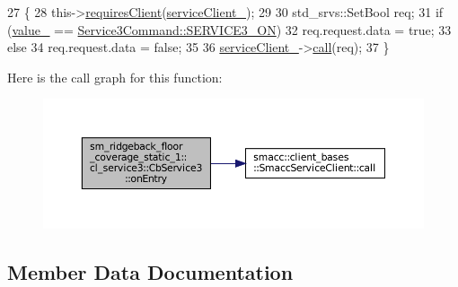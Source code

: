 \begin{DoxyCode}
27   \{
28     this->\hyperlink{classsmacc_1_1ISmaccClientBehavior_a32b16e99e3b4cb289414203dc861a440}{requiresClient}(\hyperlink{classsm__ridgeback__floor__coverage__static__1_1_1cl__service3_1_1CbService3_aabf21a061de68683b96bb96e6d5d88ad}{serviceClient\_});
29 
30     std\_srvs::SetBool req;
31     \textcolor{keywordflow}{if} (\hyperlink{classsm__ridgeback__floor__coverage__static__1_1_1cl__service3_1_1CbService3_a845615b00a06fa3d08fff04282572348}{value\_} == \hyperlink{namespacesm__ridgeback__floor__coverage__static__1_1_1cl__service3_aaba74bbc34b595ed42909975cedd5961a13cdca48a01bbb44fa8fb35567fbc58e}{Service3Command::SERVICE3\_ON})
32       req.request.data = \textcolor{keyword}{true};
33     \textcolor{keywordflow}{else}
34       req.request.data = \textcolor{keyword}{false};
35 
36     \hyperlink{classsm__ridgeback__floor__coverage__static__1_1_1cl__service3_1_1CbService3_aabf21a061de68683b96bb96e6d5d88ad}{serviceClient\_}->\hyperlink{classsmacc_1_1client__bases_1_1SmaccServiceClient_a0e9914f45f1091c38bb9ad6187d07977}{call}(req);
37   \}
\end{DoxyCode}
Here is the call graph for this function\+:
\nopagebreak
\begin{figure}[H]
\begin{center}
\leavevmode
\includegraphics[width=350pt]{classsm__ridgeback__floor__coverage__static__1_1_1cl__service3_1_1CbService3_a0eda2e4af98ebc090234b7f7eacced89_cgraph}
\end{center}
\end{figure}


\subsection{Member Data Documentation}
\mbox{\label{classsm__ridgeback__floor__coverage__static__1_1_1cl__service3_1_1CbService3_aabf21a061de68683b96bb96e6d5d88ad}} 
